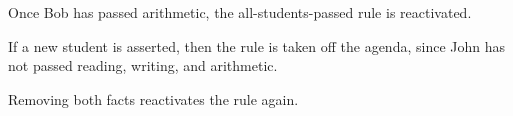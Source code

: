 \documentclass[letterpaper,10pt,english]{sphinxmanual}
\begin{document}
Once Bob has passed arithmetic, the all-students-passed rule is
reactivated.

\begin{sphinxVerbatim}[commandchars=\\\{\}]
   
 
  \PYGZbs{}
     
\end{sphinxVerbatim}

If a new student is asserted, then the rule is taken off the agenda,
since John has not passed reading, writing, and arithmetic.

\begin{sphinxVerbatim}[commandchars=\\\{\}]
   
 
\end{sphinxVerbatim}

Removing both  facts reactivates the rule again.

\begin{sphinxVerbatim}[commandchars=\\\{\}]
   
 
  
     
\end{sphinxVerbatim}
\end{document}
